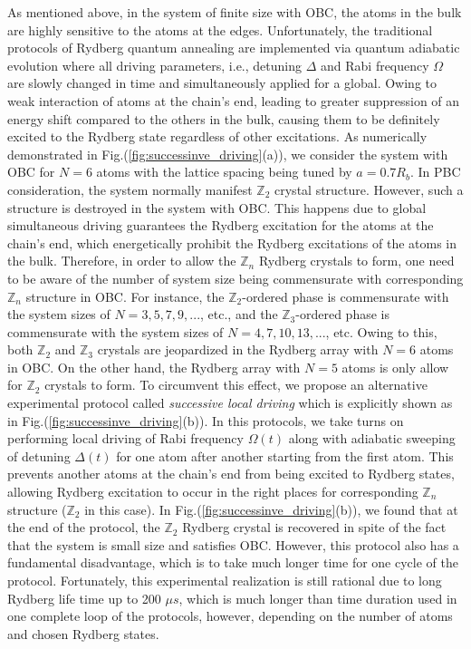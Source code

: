 \documentclass[%
 reprint,
nofootinbib,
 amsmath,amssymb,
 aps,
pra,
floatfix,
]{revtex4-2}
\begin{document}
As mentioned above, in the system of finite size with OBC, the atoms in the bulk are highly sensitive to the atoms at the edges. Unfortunately, the traditional protocols of Rydberg quantum annealing are implemented via quantum adiabatic evolution where all driving parameters, i.e., detuning $\Delta$ and Rabi frequency $\Omega$ are slowly changed in time and simultaneously applied for a global. Owing to weak interaction of atoms at the chain's end, leading to greater suppression of an energy shift compared to the others in the bulk, causing them to be definitely excited to the Rydberg state regardless of other excitations. As numerically demonstrated in Fig.(\ref{fig:successinve_driving}(a)), we consider the system with OBC for $N=6$ atoms with the lattice spacing being tuned by $a = 0.7R_b$. In PBC consideration, the system normally manifest $\mathbb{Z}_2$ crystal structure. However, such a structure is destroyed in the system with OBC. This happens due to global simultaneous driving guarantees the Rydberg excitation for the atoms at the chain's end, which energetically prohibit the Rydberg excitations of the atoms in the bulk. Therefore, in order to allow the $\mathbb{Z}_n$ Rydberg crystals to form, one need to be aware of the number of system size being commensurate with corresponding $\mathbb{Z}_n$ structure in OBC. For instance, the $\mathbb{Z}_2$-ordered phase is commensurate with the system sizes of $N=3,5,7,9,...$, etc., and the $\mathbb{Z}_3$-ordered phase is commensurate with the system sizes of $N=4,7,10,13,...$,  etc. Owing to this, both $\mathbb{Z}_2$ and $\mathbb{Z}_3$ crystals are jeopardized in the Rydberg array with $N=6$ atoms in OBC. On the other hand, the Rydberg array with $N=5$ atoms is only allow for $\mathbb{Z}_2$ crystals to form. To circumvent this effect, we propose an alternative experimental protocol called \emph{successive local driving} which is explicitly shown as in Fig.(\ref{fig:successinve_driving}(b)). In this protocols, we take turns on performing local driving of Rabi frequency $\Omega(t)$ along with adiabatic sweeping of detuning $\Delta(t)$ for one atom after another starting from the first atom. This prevents another atoms at the chain's end from being excited to Rydberg states, allowing Rydberg excitation to occur in the right places for corresponding $\mathbb{Z}_n$ structure ($\mathbb{Z}_2$ in this case). In Fig.(\ref{fig:successinve_driving}(b)), we found that at the end of the protocol, the $\mathbb{Z}_2$ Rydberg crystal is recovered in spite of the fact that the system is small size and satisfies OBC. However, this protocol also has a fundamental disadvantage, which is to take much longer time for one cycle of the protocol. Fortunately, this experimental realization is still rational due to long Rydberg life time up to 200 $\mu s$, which is much longer than time duration used in one complete loop of the protocols, however, depending on the number of atoms and chosen Rydberg states.  
\end{document}
